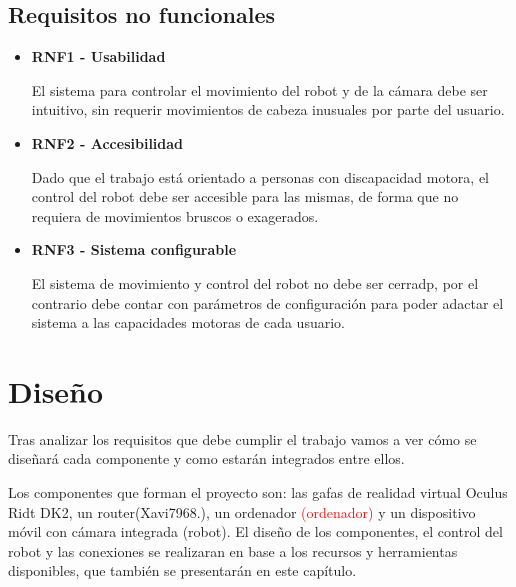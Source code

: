 \documentclass[twoside, 11pt]{epstfg}
\begin{document}
\section{Requisitos no funcionales}

\begin{itemize}
	\item \textbf{RNF1 - Usabilidad}
	
	
	El sistema para controlar el movimiento del robot y de la cámara debe ser intuitivo, sin requerir movimientos de cabeza inusuales por parte del usuario.
	
	
	
	\item \textbf{RNF2 - Accesibilidad}
	
	Dado que el trabajo está orientado a personas con discapacidad motora, el control del robot debe ser accesible para las mismas, de forma que no requiera de movimientos bruscos o exagerados. 
	
	\item \textbf{RNF3 - Sistema configurable}
	
	El sistema de movimiento y control del robot no debe ser cerradp, por el contrario debe contar con parámetros de configuración para poder adactar el sistema a las capacidades motoras de cada usuario.
\end{itemize}


\chapter{Diseño}

Tras analizar los requisitos que debe cumplir el trabajo vamos a ver cómo se diseñará cada componente y como estarán integrados entre ellos.

Los componentes que forman el proyecto son: las gafas de realidad virtual Oculus Ridt DK2, un router(Xavi7968.), un ordenador \textcolor{red}{(ordenador)} y un dispositivo móvil con cámara integrada (robot).
El diseño de los componentes, el control del robot y las conexiones se realizaran en base a los recursos y herramientas disponibles, que también se presentarán en este capítulo.
\end{document}
